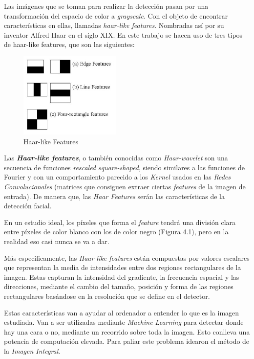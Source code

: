 Las imágenes que se toman para realizar la detección pasan por una transformación del espacio de color a \textit{grayscale}. Con el objeto de encontrar características en ellas, llamadas \textit{haar-like features}. Nombradas así por su inventor Alfred Haar en el siglo XIX. En este trabajo se hacen uso de tres tipos de haar-like features, que son las siguientes:

\begin{figure}[htp]
	\centering
	\includegraphics[width=5cm]{imagenes/haar-like.jpeg}
	\caption{Haar-like Features}
	\label{fig:haarLike}
\end{figure}

Las \textbf{\textit{Haar-like features}}, o también conocidas como \textit{Haar-wavelet} son una secuencia de funciones \textit{rescaled square-shaped}, siendo similares a las funciones de Fourier y con un comportamiento parecido a los \textit{Kernel} usados en las \textit{Redes Convolucionales} (matrices que consiguen extraer ciertas \textit{features} de la imagen de entrada). De manera que, las \textit{Haar Features} serán las características de la detección facial.

En un estudio ideal, los píxeles que forma el \textit{feature} tendrá una división clara entre píxeles de color blanco con los de color negro (Figura 4.1), pero en la realidad eso casi nunca se va a dar.

Más especificamente, las \textit{Haar-like features} están compuestas por valores escalares que representan la media de intensidades entre dos regiones rectangulares de la imagen. Estas capturan la intensidad del gradiente, la frecuencia espacial y las direcciones, mediante el cambio del tamaño, posición y forma de las regiones rectangulares basándose en la resolución que se define en el detector. \cite{haar-like}

Estas características van a ayudar al ordenador a entender lo que es la imagen estudiada. Van a ser utilizadas mediante \textit{Machine Learning} para detectar donde hay una cara o no, mediante un recorrido sobre toda la imagen. Esto conlleva una potencia de computación elevada. Para paliar este problema idearon el método de la \textit{Imagen Integral}.

